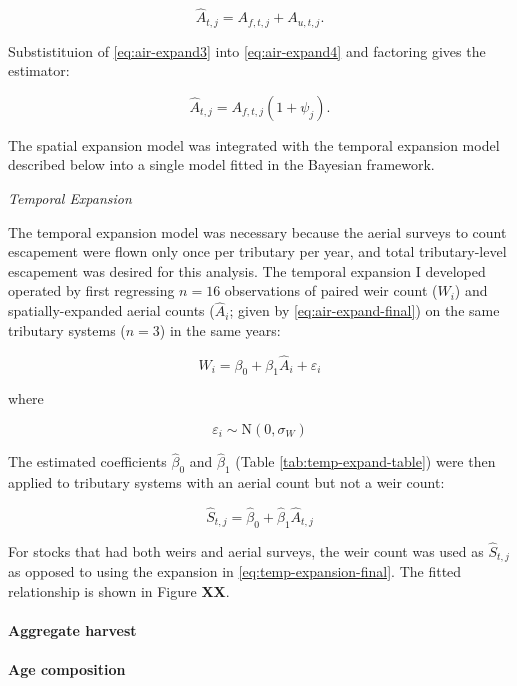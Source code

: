 \documentclass[12pt,]{book}
\let\oldparagraph\paragraph
\renewcommand{\paragraph}[1]{\oldparagraph{#1}\mbox{}}
\theoremstyle{definition}
\theoremstyle{definition}
\theoremstyle{definition}
\theoremstyle{remark}
\begin{document}
\begin{equation}
  \hat{A}_{t,j} = A_{f,t,j} + A_{u,t,j}.
  \label{eq:air-expand4}
\end{equation}

\noindent
Substistituion of \eqref{eq:air-expand3} into \eqref{eq:air-expand4} and
factoring gives the estimator:

\begin{equation}
  \hat{A}_{t,j}=A_{f,t,j}(1 + \psi_j).
  \label{eq:air-expand-final}
\end{equation}

The spatial expansion model was integrated with the temporal expansion
model described below into a single model fitted in the Bayesian
framework.

\noindent
\emph{Temporal Expansion}

\noindent
The temporal expansion model was necessary because the aerial surveys to
count escapement were flown only once per tributary per year, and total
tributary-level escapement was desired for this analysis. The temporal
expansion I developed operated by first regressing \(n = 16\)
observations of paired weir count (\(W_i\)) and spatially-expanded
aerial counts (\(\hat{A}_{i}\); given by \eqref{eq:air-expand-final}) on
the same tributary systems (\(n = 3\)) in the same years:

\[W_i = \beta_0 + \beta_1 \hat{A}_i + \varepsilon_i\]

\noindent
where

\[\varepsilon_i \sim \text{N}(0,\sigma_W)\]

The estimated coefficients \(\hat{\beta}_0\) and \(\hat{\beta}_1\)
(Table \ref{tab:temp-expand-table}) were then applied to tributary
systems with an aerial count but not a weir count:

\[\hat{S}_{t,j}=\hat{\beta}_0 + \hat{\beta}_1 \hat{A}_{t,j} \]

For stocks that had both weirs and aerial surveys, the weir count was
used as \(\hat{S}_{t,j}\) as opposed to using the expansion in
\eqref{eq:temp-expansion-final}. The fitted relationship is shown in
Figure \textbf{XX}.

\paragraph{Aggregate harvest}\label{aggregate-harvest}

\paragraph{Age composition}\label{age-composition}
\end{document}
